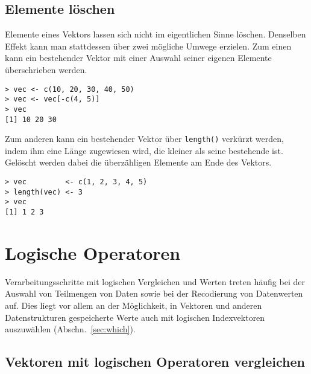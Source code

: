 \subsection{Elemente löschen}

Elemente eines Vektors lassen sich nicht im eigentlichen Sinne löschen. Denselben Effekt kann man stattdessen über zwei mögliche Umwege erzielen. Zum einen kann ein bestehender Vektor mit einer Auswahl seiner eigenen Elemente überschrieben werden.
\begin{lstlisting}
> vec <- c(10, 20, 30, 40, 50)
> vec <- vec[-c(4, 5)]
> vec
[1] 10 20 30
\end{lstlisting}

Zum anderen kann ein bestehender Vektor über \lstinline!length()! verkürzt werden, indem ihm eine Länge zugewiesen wird, die kleiner als seine bestehende ist. Gelöscht werden dabei die überzähligen Elemente am Ende des Vektors.
\begin{lstlisting}
> vec         <- c(1, 2, 3, 4, 5)
> length(vec) <- 3
> vec
[1] 1 2 3
\end{lstlisting}

\section{Logische Operatoren}

Verarbeitungsschritte mit logischen Vergleichen und Werten treten häufig bei der Auswahl von Teilmengen von Daten sowie bei der Recodierung von Datenwerten auf. Dies liegt vor allem an der Möglichkeit, in Vektoren und anderen Datenstrukturen gespeicherte Werte auch mit logischen Indexvektoren auszuwählen (Abschn.\ \ref{sec:which}).

\subsection{Vektoren mit logischen Operatoren vergleichen}
\label{sec:compare_vec_logical}

